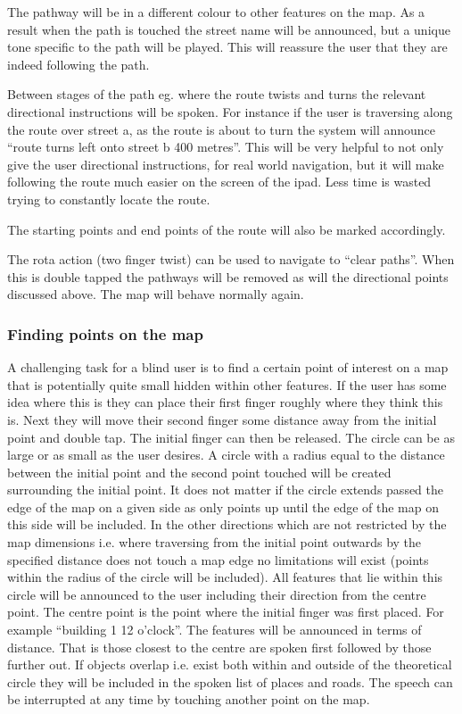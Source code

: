 \documentclass[11pt,twoside,a4paper]{article}
\begin{document}
The pathway will be in a different colour to other features on the
map. As a result when the path is touched the street name will be
announced, but a unique tone specific to the path will be played. This
will reassure the user that they are indeed following the path.

Between stages of the path eg. where the route twists and turns the
relevant directional instructions will be spoken. For instance if the
user is traversing along the route over street a, as the route is about
to turn the system will announce ``route turns left onto street b 400
metres''. This will be very helpful to not only give the user
directional instructions, for real world navigation, but it will make
following the route much easier on the screen of the ipad. Less time is
wasted trying to constantly locate the route.

The starting points and end points of the route will also be marked
accordingly.

The rota action (two finger twist) can be used to navigate to ``clear
paths''. When this is double tapped the pathways will be removed as will
the directional points discussed above. The map will behave normally
again.

\subsubsection{Finding points on the map}

A challenging task for a blind user is to find a certain point of
interest on a map that is potentially quite small hidden within other
features. If the user has some idea where this is they can place their
first finger roughly where they think this is. Next they will move their
second finger some distance away from the initial point and double
tap. The initial finger can then be released.
The circle can be as large or as small
as the user desires. A circle with a radius equal to the distance
between the initial point and the second point touched will be created
surrounding the initial point. It does not matter if the circle extends
passed the edge of the map on a given side as only points up until the
edge of the map on this side will be included. In the other directions
which are not restricted by the map dimensions i.e. where traversing
from the initial point outwards by the specified distance does not touch
a map edge no limitations will exist (points within the radius of the
circle will be included). 
All features that lie within this circle will be
announced to the user including their direction from the centre
point. The centre point is the point where the initial finger was first
placed. For example ``building 1 12 o'clock''. The features will be
announced in terms of distance. That is those closest to the centre are
spoken first followed by those further out. If objects overlap i.e. exist both within and
outside of the theoretical circle they will be included in the spoken
list of places and roads.
The speech can be interrupted at any time by touching another point on the map.
\end{document}
